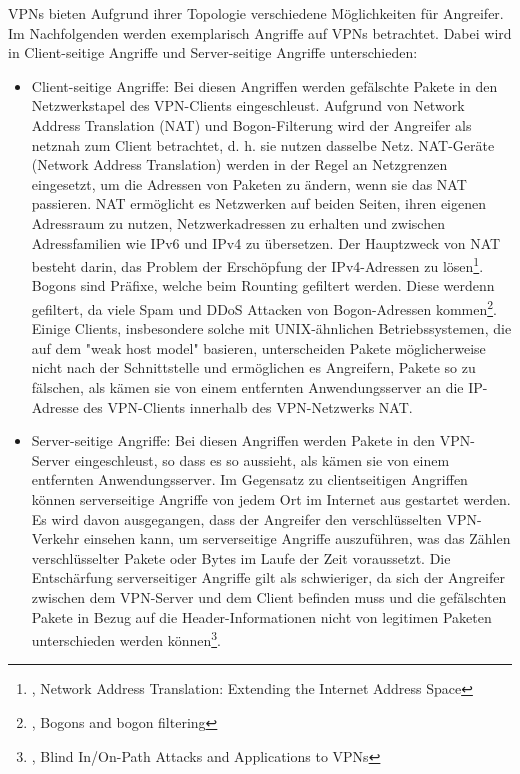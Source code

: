 VPNs bieten Aufgrund ihrer Topologie verschiedene Möglichkeiten für Angreifer. Im Nachfolgenden werden exemplarisch Angriffe auf VPNs betrachtet. Dabei wird in Client-seitige Angriffe und Server-seitige Angriffe unterschieden:

\begin{itemize}
    \item Client-seitige Angriffe: Bei diesen Angriffen werden gefälschte Pakete in den Netzwerkstapel des VPN-Clients eingeschleust. Aufgrund von Network Address Translation (NAT) und Bogon-Filterung wird der Angreifer als netznah zum Client betrachtet, d. h. sie nutzen dasselbe Netz. NAT-Geräte (Network Address Translation) werden in der Regel an Netzgrenzen eingesetzt, um die Adressen von Paketen zu ändern, wenn sie das NAT passieren. NAT ermöglicht es Netzwerken auf beiden Seiten, ihren eigenen Adressraum zu nutzen, Netzwerkadressen zu erhalten und zwischen Adressfamilien wie IPv6 und IPv4 zu übersetzen. Der Hauptzweck von NAT besteht darin, das Problem der Erschöpfung der IPv4-Adressen zu lösen\footnote{\cite{NetworkAddressTranslation}, Network Address Translation: Extending the Internet Address Space}. Bogons sind Präfixe, welche beim Rounting gefiltert werden. Diese werdenn gefiltert, da viele Spam und DDoS Attacken von Bogon-Adressen kommen\footnote{\cite{BogonFiltering}, Bogons and bogon filtering}. Einige Clients, insbesondere solche mit UNIX-ähnlichen Betriebssystemen, die auf dem "weak host model" basieren, unterscheiden Pakete möglicherweise nicht nach der Schnittstelle und ermöglichen es Angreifern, Pakete so zu fälschen, als kämen sie von einem entfernten Anwendungsserver an die IP-Adresse des VPN-Clients innerhalb des VPN-Netzwerks NAT.
    \item Server-seitige Angriffe: Bei diesen Angriffen werden Pakete in den VPN-Server eingeschleust, so dass es so aussieht, als kämen sie von einem entfernten Anwendungsserver. Im Gegensatz zu clientseitigen Angriffen können serverseitige Angriffe von jedem Ort im Internet aus gestartet werden. Es wird davon ausgegangen, dass der Angreifer den verschlüsselten VPN-Verkehr einsehen kann, um serverseitige Angriffe auszuführen, was das Zählen verschlüsselter Pakete oder Bytes im Laufe der Zeit voraussetzt. Die Entschärfung serverseitiger Angriffe gilt als schwieriger, da sich der Angreifer zwischen dem VPN-Server und dem Client befinden muss und die gefälschten Pakete in Bezug auf die Header-Informationen nicht von legitimen Paketen unterschieden werden können\footnote{\cite{AttacksOnVPNs}, Blind In/On-Path Attacks and Applications to VPNs}.
\end{itemize}
